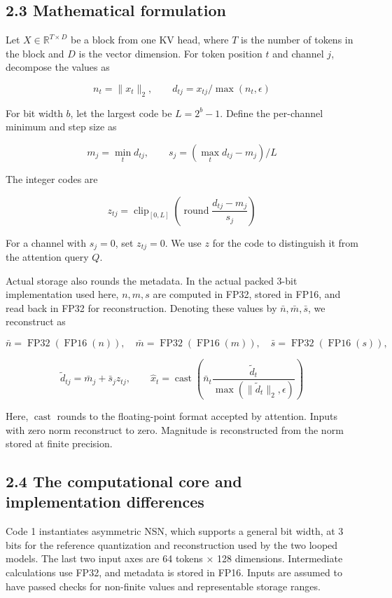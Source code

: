 \documentclass[10pt,a4paper]{article}
\begin{document}
\subsection{2.3 Mathematical formulation}\label{mathematical-formulation}

Let \(X\in\mathbb{R}^{T\times D}\) be a block from one KV head, where \(T\) is the number of tokens in the block and \(D\) is the vector dimension. For token position \(t\) and channel \(j\), decompose the values as

\[
n_t=\lVert x_t\rVert_2,\qquad d_{tj}=x_{tj}/\max(n_t,\epsilon)
\]

For bit width \(b\), let the largest code be \(L=2^b-1\). Define the per-channel minimum and step size as

\[
m_j=\min_t d_{tj},\qquad
s_j=(\max_t d_{tj}-m_j)/L
\]

The integer codes are

\[
z_{tj}=\operatorname{clip}_{[0,L]}
\left(\operatorname{round}\frac{d_{tj}-m_j}{s_j}\right)
\]

For a channel with \(s_j=0\), set \(z_{tj}=0\). We use \(z\) for the code to distinguish it from the attention query \(Q\).

Actual storage also rounds the metadata. In the actual packed 3-bit implementation used here, \(n,m,s\) are computed in FP32, stored in FP16, and read back in FP32 for reconstruction. Denoting these values by \(\bar n,\bar m,\bar s\), we reconstruct as

\[
\bar n=\operatorname{FP32}(\operatorname{FP16}(n)),\quad
\bar m=\operatorname{FP32}(\operatorname{FP16}(m)),\quad
\bar s=\operatorname{FP32}(\operatorname{FP16}(s)),
\]

\[
\widetilde d_{tj}=\bar m_j+\bar s_jz_{tj},\qquad
\widehat x_t=\operatorname{cast}
\left(\bar n_t\frac{\widetilde d_t}
{\max(\lVert\widetilde d_t\rVert_2,\epsilon)}\right)
\]

Here, \(\operatorname{cast}\) rounds to the floating-point format accepted by attention. Inputs with zero norm reconstruct to zero. Magnitude is reconstructed from the norm stored at finite precision.

\subsection{2.4 The computational core and implementation differences}\label{the-computational-core-and-implementation-differences}

Code 1 instantiates asymmetric NSN, which supports a general bit width, at 3 bits for the reference quantization and reconstruction used by the two looped models. The last two input axes are 64 tokens × 128 dimensions. Intermediate calculations use FP32, and metadata is stored in FP16. Inputs are assumed to have passed checks for non-finite values and representable storage ranges.
\end{document}
